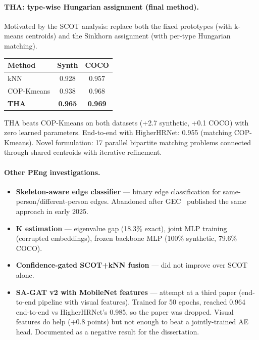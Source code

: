 \paragraph{THA: type-wise Hungarian assignment (final method).}

Motivated by the SCOT analysis: replace both the fixed prototypes (with k-means centroids) and the Sinkhorn assignment (with per-type Hungarian matching).

\begin{tabular}{lcc}
\hline
\textbf{Method} & \textbf{Synth} & \textbf{COCO} \\
\hline
kNN & 0.928 & 0.957 \\
COP-Kmeans & 0.938 & 0.968 \\
\textbf{THA} & \textbf{0.965} & \textbf{0.969} \\
\hline
\end{tabular}

\vspace{0.5em}

THA beats COP-Kmeans on both datasets (+2.7 synthetic, +0.1 COCO) with zero learned parameters. End-to-end with HigherHRNet: 0.955 (matching COP-Kmeans). Novel formulation: 17 parallel bipartite matching problems connected through shared centroids with iterative refinement.

\paragraph{Other PEng investigations.}
\begin{itemize}
    \item \textbf{Skeleton-aware edge classifier} --- binary edge classification for same-person/different-person edges. Abandoned after GEC~\cite{maher2025gec} published the same approach in early 2025.
    \item \textbf{K estimation} --- eigenvalue gap (18.3\% exact), joint MLP training (corrupted embeddings), frozen backbone MLP (100\% synthetic, 79.6\% COCO).
    \item \textbf{Confidence-gated SCOT+kNN fusion} --- did not improve over SCOT alone.
    \item \textbf{SA-GAT v2 with MobileNet features} --- attempt at a third paper (end-to-end pipeline with visual features). Trained for 50 epochs, reached 0.964 end-to-end vs HigherHRNet's 0.985, so the paper was dropped. Visual features do help (+0.8 points) but not enough to beat a jointly-trained AE head. Documented as a negative result for the dissertation.
\end{itemize}

